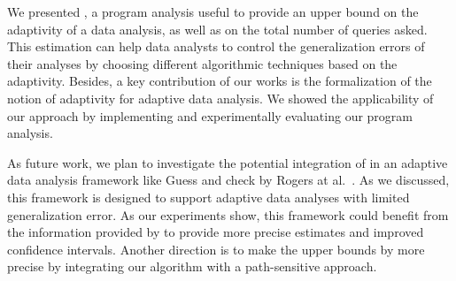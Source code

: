We presented {\THESYSTEM}, a program analysis useful to provide an upper bound on the adaptivity of a data analysis, as well as on the total number of queries asked. This estimation can help data analysts to control the generalization errors of their analyses by choosing different algorithmic techniques based on the adaptivity. Besides, a key contribution of our works is the formalization of the notion of adaptivity for adaptive data analysis. We showed the applicability of our approach by implementing and experimentally evaluating our program analysis.

As future work, we plan to investigate the potential integration of  {\THESYSTEM} in an adaptive data analysis framework like Guess and check by Rogers at al.~\cite{RogersRSSTW20}. As we discussed, this framework is  designed to support adaptive data analyses with limited generalization error. As our experiments show, this framework could benefit from the information provided by {\THESYSTEM} to provide more precise estimates and improved confidence intervals. Another direction is to make 
the upper bounds by {\THESYSTEM} more precise by integrating our algorithm with a path-sensitive approach.


